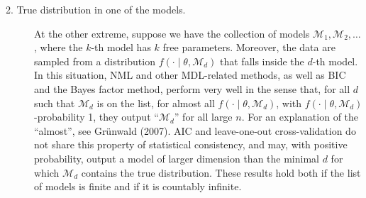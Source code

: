 \documentclass[authoryear]{elsarticle}
\newcommand{\model}{\mathcal{M}}
\begin{document}
\begin{description}
\item[2. True distribution in one of the models.]
  At the other extreme, suppose we have the collection of models
  $\model_1, \model_2, \ldots$, where the $k$-th model has $k$ free
  parameters. Moreover, the data are sampled from a distribution
  $f(\cdot \mid \theta, \model_d)$
  that  falls inside the $d$-th model.
  In this situation, NML and other MDL-related methods,
  as well as BIC and the Bayes factor method, perform very well in the
  sense that, for all $d$ such that $\model_d$ is on the list, for almost all
  $f(\cdot \mid\theta, \model_d)$, with $f(\cdot \mid\theta,
  \model_d)$-probability 1, they output ``$\model_d$'' for all large
  $n$. For an explanation of the ``almost'', see Gr\"unwald (2007).
  AIC and leave-one-out cross-validation do not share this property of
  statistical consistency, and may, with positive probability, output
  a model of larger dimension than the minimal $d$ for which
  $\model_d$ contains the true
  distribution. These results hold both if the list of models is
  finite and if it is countably infinite.\vspace*{12pt}


\end{description}
\end{document}
